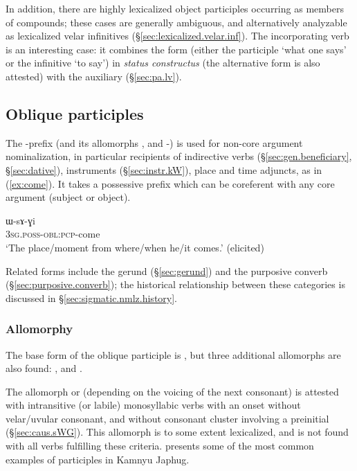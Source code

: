  
In addition, there are highly lexicalized object participles occurring as members of compounds; these cases are generally ambiguous, and alternatively analyzable as  lexicalized velar infinitives (§\ref{sec:lexicalized.velar.inf}). The incorporating verb  is an interesting case: it combines the form  (either the participle `what one says' or the infinitive `to say') in \textit{status constructus}  (the alternative form  is also attested) with the auxiliary  (§\ref{sec:pa.lv}).
 
\subsection{Oblique participles} \label{sec:oblique.participle}
The -prefix (and its allomorphs ,  and -) is used for non-core argument nominalization, in particular recipients of indirective verbs (§\ref{sec:gen.beneficiary}, §\ref{sec:dative}), instruments (§\ref{sec:instr.kW}), place and time adjuncts, as in (\ref{ex:come}). It takes a possessive prefix which can be coreferent with any core argument (subject or object).

\begin{exe}
\ex \label{ex:come}
\gll ɯ-sɤ-ɣi \\
 \textsc{3sg}.\textsc{poss}-\textsc{obl}:\textsc{pcp}-come \\
\glt  `The place/moment from where/when he/it comes.' (elicited)
\end{exe}

Related forms include the gerund (§\ref{sec:gerund}) and the purposive converb (§\ref{sec:purposive.converb}); the historical relationship between these categories is discussed in §\ref{sec:sigmatic.nmlz.history}.
 
 
 \subsubsection{Allomorphy} \label{sec:oblique.participle.allomorphy}
The base form of the oblique participle is , but three additional allomorphs are also found: ,  and .

The allomorph  or  (depending on the voicing of the next consonant) is attested with intransitive (or labile) monosyllabic verbs with an onset without velar/uvular consonant, and without consonant cluster involving a preinitial (§\ref{sec:caus.sWG}). This allomorph is to some extent lexicalized, and is not found with all verbs fulfilling these criteria.  presents some of the most common examples of  participles in Kamnyu Japhug.

